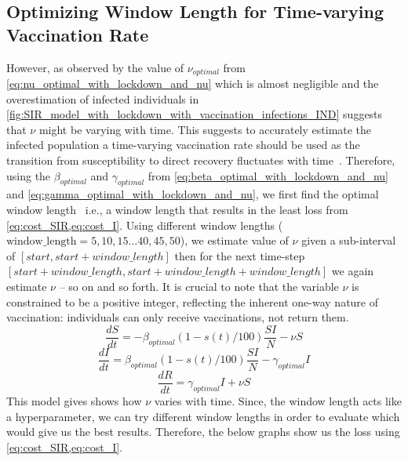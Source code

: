 \documentclass[tikz,fleqn,12pt]{wlscirep}
\begin{document}
\subsection{Optimizing Window Length for Time-varying Vaccination Rate}\label{optimizing_window_length}
However, as observed by the value of $\nu_{optimal}$ from \cref{eq:nu_optimal_with_lockdown_and_nu} which is almost negligible and the overestimation of infected individuals in \cref{fig:SIR_model_with_lockdown_with_vaccination_infections_IND} suggests that $\nu$ might be varying with time. This suggests to accurately estimate the infected population a time-varying vaccination rate should be used as the transition from susceptibility to direct recovery fluctuates with time~\cite{Liang2021,Marinov2022}. Therefore, using the $\beta_{optimal}$ and $\gamma_{optimal}$ from \cref{eq:beta_optimal_with_lockdown_and_nu} and \cref{eq:gamma_optimal_with_lockdown_and_nu}, we first find the optimal window length~\cite{Liao2020} i.e., a window length that results in the least loss from \cref{eq:cost_SIR,eq:cost_I}. Using different window lengths ($\textrm{window\_length} = 5, 10, 15 \dots 40, 45, 50$), we estimate value of $\nu$ given a sub-interval of $[{start}, {start} + {window\_length}]$ then for the next time-step $[{start} + {window\_length}, {start} + {window\_length} + {window\_length}]$ we again estimate $\nu$ -- so on and so forth. It is crucial to note that the variable $\nu$ is constrained to be a positive integer, reflecting the inherent one-way nature of vaccination: individuals can only receive vaccinations, not return them.
\begin{equation}
  \frac{dS}{dt} = -\beta_{optimal}  (1 - s(t)/100)  \frac{S I}{N} - \nu S
  \label{eq:S_with_lockdown_and_nu_calc_nu}
\end{equation}
\begin{equation}
  \frac{dI}{dt} = \beta_{optimal}  (1 - s(t)/100) \frac{S I}{N} - \gamma_{optimal} I
  \label{eq:I_with_lockdown_and_nu_calc_nu}
\end{equation}
\begin{equation}
  \frac{dR}{dt} = \gamma_{optimal} I + \nu S
  \label{eq:R_with_lockdown_and_nu_calc_nu}
\end{equation}
This model gives shows how $\nu$ varies with time. Since, the window length acts like a hyperparameter, we can try different window lengths in order to evaluate which would give us the best results. Therefore, the below graphs show us the loss using \cref{eq:cost_SIR,eq:cost_I}.
\end{document}
